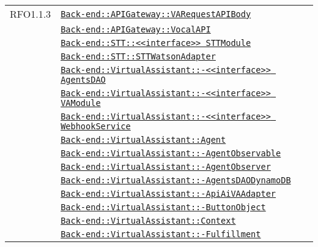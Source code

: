 \begin{longtable}{|>{\centering}m{3cm}|m{10cm}<{\centering}|}
RFO1.1.3 & \hyperref[Back-end::APIGateway::VARequestAPIBody]{\texttt{Back-end::APIGateway::VARequestAPIBody}}\\
& \hyperref[Back-end::APIGateway::VocalAPI]{\texttt{Back-end::APIGateway::VocalAPI}}\\
& \hyperref[Back-end::STT::<<interface>> STTModule]{\texttt{Back-end::STT::<<interface>> STTModule}}\\
& \hyperref[Back-end::STT::STTWatsonAdapter]{\texttt{Back-end::STT::STTWatsonAdapter}}\\
& \hyperref[Back-end::VirtualAssistant::<<interface>> AgentsDAO]{\texttt{Back-end::VirtualAssistant::-\linebreak <<interface>> AgentsDAO}}\\
& \hyperref[Back-end::VirtualAssistant::<<interface>> VAModule]{\texttt{Back-end::VirtualAssistant::-\linebreak <<interface>> VAModule}}\\
& \hyperref[Back-end::VirtualAssistant::<<interface>> WebhookService]{\texttt{Back-end::VirtualAssistant::-\linebreak <<interface>> WebhookService}}\\
& \hyperref[Back-end::VirtualAssistant::Agent]{\texttt{Back-end::VirtualAssistant::Agent}}\\
& \hyperref[Back-end::VirtualAssistant::AgentObservable]{\texttt{Back-end::VirtualAssistant::-\linebreak AgentObservable}}\\
& \hyperref[Back-end::VirtualAssistant::AgentObserver]{\texttt{Back-end::VirtualAssistant::-\linebreak AgentObserver}}\\
& \hyperref[Back-end::VirtualAssistant::AgentsDAODynamoDB]{\texttt{Back-end::VirtualAssistant::-\linebreak AgentsDAODynamoDB}}\\
& \hyperref[Back-end::VirtualAssistant::ApiAiVAAdapter]{\texttt{Back-end::VirtualAssistant::-\linebreak ApiAiVAAdapter}}\\
& \hyperref[Back-end::VirtualAssistant::ButtonObject]{\texttt{Back-end::VirtualAssistant::-\linebreak ButtonObject}}\\
& \hyperref[Back-end::VirtualAssistant::Context]{\texttt{Back-end::VirtualAssistant::Context}}\\
& \hyperref[Back-end::VirtualAssistant::Fulfillment]{\texttt{Back-end::VirtualAssistant::-\linebreak Fulfillment}}\\

\end{longtable}
